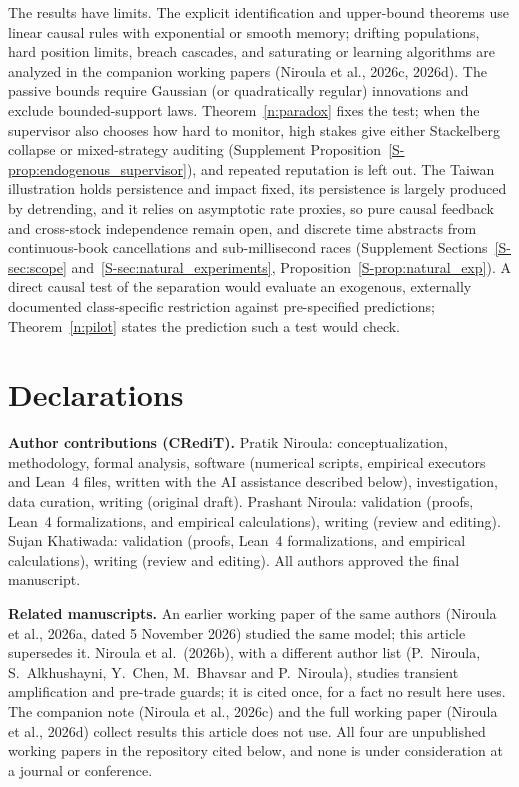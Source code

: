 \documentclass[11pt,letterpaper]{article}
\theoremstyle{definition}
\begin{document}
The results have limits. The explicit identification and upper-bound theorems use linear causal rules with exponential or smooth memory; drifting populations, hard position limits, breach cascades, and saturating or learning algorithms are analyzed in the companion working papers (Niroula et al., 2026c, 2026d). The passive bounds require Gaussian (or quadratically regular) innovations and exclude bounded-support laws. Theorem~\ref{n:paradox} fixes the test; when the supervisor also chooses how hard to monitor, high stakes give either Stackelberg collapse or mixed-strategy auditing (Supplement Proposition~\ref{S-prop:endogenous_supervisor}), and repeated reputation is left out. The Taiwan illustration holds persistence and impact fixed, its persistence is largely produced by detrending, and it relies on asymptotic rate proxies, so pure causal feedback and cross-stock independence remain open, and discrete time abstracts from continuous-book cancellations and sub-millisecond races (Supplement Sections~\ref{S-sec:scope} and~\ref{S-sec:natural_experiments}, Proposition~\ref{S-prop:natural_exp}). A direct causal test of the separation would evaluate an exogenous, externally documented class-specific restriction against pre-specified predictions; Theorem~\ref{n:pilot} states the prediction such a test would check.

\section*{Declarations}

\textbf{Author contributions (CRediT).} Pratik Niroula: conceptualization, methodology, formal analysis, software (numerical scripts, empirical executors and Lean~4 files, written with the AI assistance described below), investigation, data curation, writing (original draft). Prashant Niroula: validation (proofs, Lean~4 formalizations, and empirical calculations), writing (review and editing). Sujan Khatiwada: validation (proofs, Lean~4 formalizations, and empirical calculations), writing (review and editing). All authors approved the final manuscript.

\textbf{Related manuscripts.} An earlier working paper of the same authors (Niroula et al., 2026a, dated 5 November 2026) studied the same model; this article supersedes it. Niroula et al.\ (2026b), with a different author list (P.~Niroula, S.~Alkhushayni, Y.~Chen, M.~Bhavsar and P.~Niroula), studies transient amplification and pre-trade guards; it is cited once, for a fact no result here uses. The companion note (Niroula et al., 2026c) and the full working paper (Niroula et al., 2026d) collect results this article does not use. All four are unpublished working papers in the repository cited below, and none is under consideration at a journal or conference.\par\medskip
\end{document}
